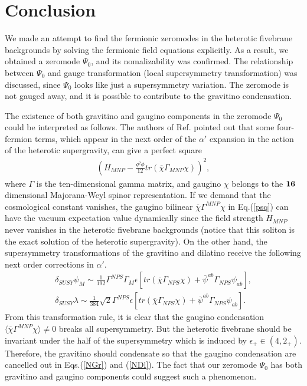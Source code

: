 \documentclass[a4paper,aps, amssymb, preprint, 12pt]{revtex4}
\begin{document}
\section{Conclusion}
\label{sec:five}
We made an attempt to find the fermionic zeromodes in the heterotic fivebrane backgrounds by solving the fermionic field equations explicitly.
As a result, we obtained a zeromode $\Psi_0$, and its nomalizability was confirmed.
The relationship between $\Psi_0$ and gauge transformation (local supersymmetry transformation) was discussed, since $\Psi_0$ looks like just a supersymmetry variation.
The zeromode is not gauged away, and it is possible to contribute to the gravitino condensation.

The existence of both gravitino and gaugino components in the zeromode $\Psi_0$ could be interpreted as follows.
The authors of Ref.\cite{GSW} pointed out that some four-fermion terms, which appear in the next order of the $\alpha'$ expansion in the action of the heterotic supergravity, can give a perfect square
\begin{eqnarray}
(H_{MNP} - \frac{g^2\phi}{12}tr(\overline{\chi}{\Gamma}_{MNP}\chi))^2, \label{psq}
\end{eqnarray}
where $\Gamma$ is the ten-dimensional gamma matrix, and gaugino $\chi$ belongs to the $\bf 16$ dimensional Majorana-Weyl spinor representation.
If we demand that the cosmological constant vanishes, the gaugino bilinear $\overline{\chi}{\Gamma}^{MNP}\chi$ in Eq.(\ref{psq}) can have the vacuum expectation value dynamically since the field strength $H_{MNP}$ never vanishes in the heterotic fivebrane backgrounds (notice that this soliton is the exact solution of the heterotic supergravity).
On the other hand, the supersymmetry transformations of the gravitino and dilatino receive the following next order corrections in $\alpha'$\cite{BdR}.
\begin{eqnarray}
\delta_{SUSY}{\psi}_M \sim 
\frac{1}{192}\Gamma^{NPS}\Gamma_M\epsilon\left[tr(\overline{\chi}\Gamma_{NPS}\chi)+\overline{\psi}^{ab}\Gamma_{NPS}\psi_{ab}\right], \label{NGr}\\
\delta_{SUSY}\lambda \sim 
\frac{1}{384}\sqrt{2}\Gamma^{NPS}\epsilon\left[tr(\overline{\chi}\Gamma_{NPS}\chi)+\overline{\psi}^{ab}\Gamma_{NPS}\psi_{ab}\right]. \label{NDl}
\end{eqnarray}
From this transformation rule, it is clear that the gaugino condensation $\langle\overline{\chi}{\Gamma}^{MNP}\chi\rangle\neq0$ breaks all supersymmetry.
But the heterotic fivebrane should be invariant under the half of the supersymmetry which is induced by $\epsilon_+\in(4,2_+)$.
Therefore, the gravitino should condensate so that the gaugino condensation are cancelled out in Eqs.(\ref{NGr}) and (\ref{NDl}).
The fact that our zeromode $\Psi_0$ has both gravitino and gaugino components could suggest such a phenomenon.
\end{document}
